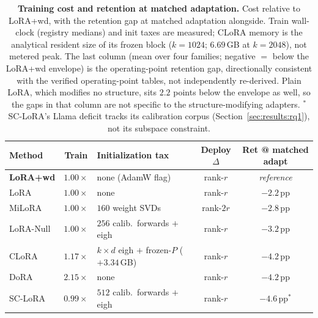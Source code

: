 \begin{table}[t]
\centering
\small
\setlength{\tabcolsep}{6pt}
\caption{\textbf{Training cost and retention at matched adaptation.} Cost
relative to LoRA{+}wd, with the retention gap at matched adaptation alongside.
Train wall-clock
(registry medians) and init taxes are measured; CLoRA memory is the analytical
resident size of its frozen block ($k{=}1024$; $6.69$\,GB at $k{=}2048$), not
metered peak. The last column (mean over four families; negative $=$ below the
LoRA{+}wd envelope) is the operating-point retention gap, directionally
consistent with the verified operating-point tables, not independently re-derived.
Plain LoRA, which modifies no structure, sits $2.2$ points below the envelope as
well, so the gaps in that column are not specific to the structure-modifying
adapters.
$^{\ast}$SC-LoRA's Llama deficit tracks its calibration corpus
(Section~\ref{sec:results:rq1}), not its subspace constraint.}
\label{tab:cost}
\begin{tabular}{l c l c c}
\toprule
Method & Train & Initialization tax & Deploy $\Delta$ & Ret @ matched adapt \\
\midrule
\textbf{LoRA{+}wd} & $1.00\times$ & none (AdamW flag) & rank-$r$ & \textit{reference} \\
LoRA        & $1.00\times$ & none & rank-$r$ & $-2.2$\,pp \\
MiLoRA      & $1.00\times$ & $160$ weight SVDs & rank-$2r$ & $-2.8$\,pp \\
LoRA-Null   & $1.00\times$ & $256$ calib.\ forwards $+$ eigh & rank-$r$ & $-3.2$\,pp \\
CLoRA       & $1.17\times$ & $k{\times}d$ eigh $+$ frozen-$P$ ($+3.34$\,GB) & rank-$r$ & $-4.2$\,pp \\
DoRA        & $2.15\times$ & none & rank-$r$ & $-4.2$\,pp \\
SC-LoRA     & $0.99\times$ & $512$ calib.\ forwards $+$ eigh & rank-$r$ & $-4.6$\,pp$^{\ast}$ \\
\bottomrule
\end{tabular}
\end{table}

